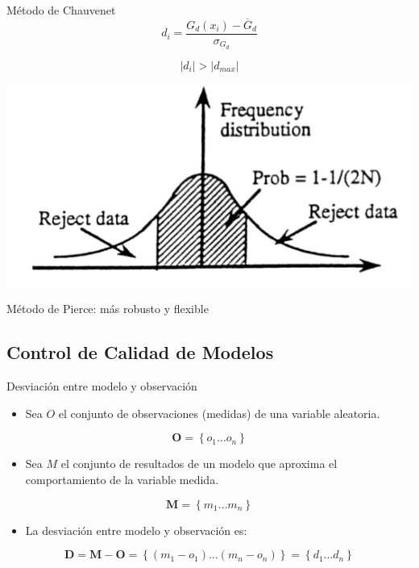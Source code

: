 \documentclass[xcolor={usenames,svgnames,dvipsnames}]{beamer}
\begin{document}
\begin{frame}[label={sec:org89397cc}]{Método de Chauvenet}
\[
d_i = \frac{G_d(x_i) - \overline{G}_d}{\sigma_{G_d}}
\]

\[
\left| d_i \right| > \left| d_{max} \right|
\]

\begin{center}
\begin{center}
\includegraphics[width=.9\linewidth]{../figs/chauvenet.png}
\end{center}
\end{center}

\begin{block}{Método de Pierce: más robusto y flexible \nocite{Ross2003}}
\end{block}
\end{frame}

\subsection{Control de Calidad de Modelos}
\label{sec:org43b155d}

\begin{frame}[label={sec:orgbdd55fd}]{Desviación entre modelo y observación}
\begin{itemize}
\item Sea \(O\) el conjunto de observaciones (medidas) de una variable aleatoria.
\end{itemize}

\[
\mathbf{O} = \left\{ o_1 \dots o_n \right\}
\]
\begin{itemize}
\item Sea \(M\) el conjunto de resultados de un modelo que aproxima el comportamiento de la variable medida.
\end{itemize}

\[
\mathbf{M} = \left\{ m_1 \dots m_n  \right\}
\]

\begin{itemize}
\item La desviación entre modelo y observación es:
\end{itemize}

\[
\mathbf{D} = \mathbf{M} - \mathbf{O} =  \left\{ (m_1 - o_1) \dots (m_n - o_n)  \right\} = \left\{ d_1 \dots d_n  \right\}
\]
\end{frame}
\end{document}
